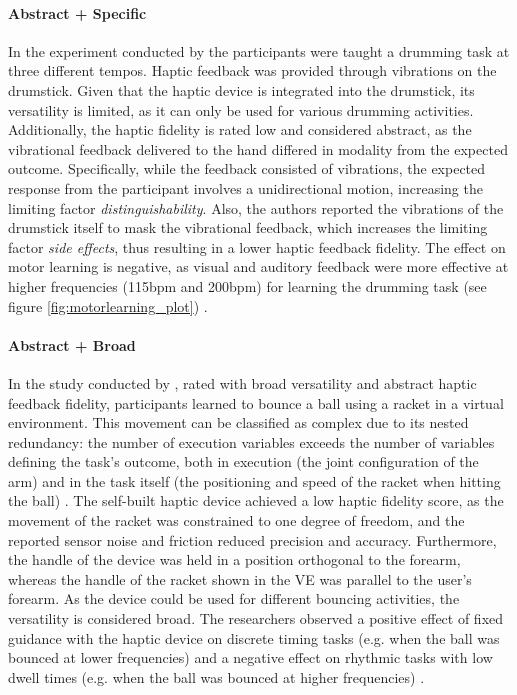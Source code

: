 \paragraph{Abstract + Specific} \label{sec:abstractspecific}
In the experiment conducted by \cite{Lee2012} the participants were taught a drumming task at three different tempos. Haptic feedback was provided through vibrations on the drumstick. Given that the haptic device is integrated into the drumstick, its versatility is limited, as it can only be used for various drumming activities. Additionally, the haptic fidelity is rated low and considered abstract, as the vibrational feedback delivered to the hand differed in modality from the expected outcome. Specifically, while the feedback consisted of vibrations, the expected response from the participant involves a unidirectional motion, increasing the limiting factor \textit{distinguishability}. Also, the authors reported the vibrations of the drumstick itself to mask the vibrational feedback, which increases the limiting factor \textit{side effects}, thus resulting in a lower haptic feedback fidelity. The effect on motor learning is negative, as visual and auditory feedback were more effective at higher frequencies (115bpm and 200bpm) for learning the drumming task (see figure \ref{fig:motorlearning_plot}) \cite{Lee2012}.

\paragraph{Abstract + Broad} \label{sec:abstractbroad}
In the study conducted by \cite{Crespo2015}, rated with broad versatility and abstract haptic feedback fidelity, participants learned to bounce a ball using a racket in a virtual environment. This movement can be classified as complex due to its nested redundancy: the number of execution variables exceeds the number of variables defining the task's outcome, both in execution (the joint configuration of the arm) and in the task itself (the positioning and speed of the racket when hitting the ball) \cite{Levac2019LearningReview}. The self-built haptic device achieved a low haptic fidelity score, as the movement of the racket was constrained to one degree of freedom, and the reported sensor noise and friction reduced precision and accuracy. Furthermore, the handle of the device was held in a position orthogonal to the forearm, whereas the handle of the racket shown in the VE was parallel to the user's forearm.  As the device could be used for different bouncing activities, the versatility is considered broad. The researchers observed a positive effect of fixed guidance with the haptic device on discrete timing tasks (e.g. when the ball was bounced at lower frequencies) and a negative effect on rhythmic tasks with low dwell times (e.g. when the ball was bounced at higher frequencies) \cite{Crespo2015}.

